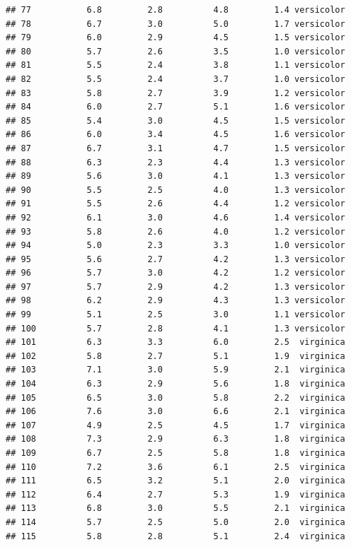 \documentclass[
]{article}
\begin{document}
\begin{verbatim}
## 77           6.8         2.8          4.8         1.4 versicolor
## 78           6.7         3.0          5.0         1.7 versicolor
## 79           6.0         2.9          4.5         1.5 versicolor
## 80           5.7         2.6          3.5         1.0 versicolor
## 81           5.5         2.4          3.8         1.1 versicolor
## 82           5.5         2.4          3.7         1.0 versicolor
## 83           5.8         2.7          3.9         1.2 versicolor
## 84           6.0         2.7          5.1         1.6 versicolor
## 85           5.4         3.0          4.5         1.5 versicolor
## 86           6.0         3.4          4.5         1.6 versicolor
## 87           6.7         3.1          4.7         1.5 versicolor
## 88           6.3         2.3          4.4         1.3 versicolor
## 89           5.6         3.0          4.1         1.3 versicolor
## 90           5.5         2.5          4.0         1.3 versicolor
## 91           5.5         2.6          4.4         1.2 versicolor
## 92           6.1         3.0          4.6         1.4 versicolor
## 93           5.8         2.6          4.0         1.2 versicolor
## 94           5.0         2.3          3.3         1.0 versicolor
## 95           5.6         2.7          4.2         1.3 versicolor
## 96           5.7         3.0          4.2         1.2 versicolor
## 97           5.7         2.9          4.2         1.3 versicolor
## 98           6.2         2.9          4.3         1.3 versicolor
## 99           5.1         2.5          3.0         1.1 versicolor
## 100          5.7         2.8          4.1         1.3 versicolor
## 101          6.3         3.3          6.0         2.5  virginica
## 102          5.8         2.7          5.1         1.9  virginica
## 103          7.1         3.0          5.9         2.1  virginica
## 104          6.3         2.9          5.6         1.8  virginica
## 105          6.5         3.0          5.8         2.2  virginica
## 106          7.6         3.0          6.6         2.1  virginica
## 107          4.9         2.5          4.5         1.7  virginica
## 108          7.3         2.9          6.3         1.8  virginica
## 109          6.7         2.5          5.8         1.8  virginica
## 110          7.2         3.6          6.1         2.5  virginica
## 111          6.5         3.2          5.1         2.0  virginica
## 112          6.4         2.7          5.3         1.9  virginica
## 113          6.8         3.0          5.5         2.1  virginica
## 114          5.7         2.5          5.0         2.0  virginica
## 115          5.8         2.8          5.1         2.4  virginica

\end{verbatim}
\end{document}

